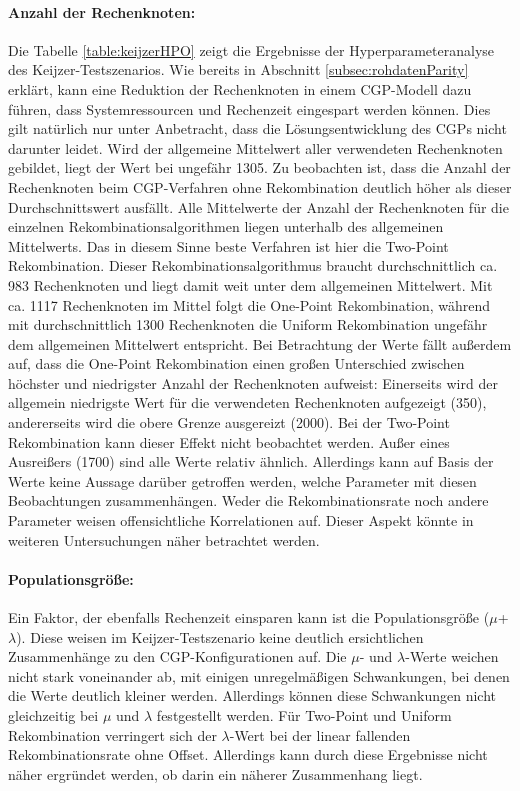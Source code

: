 \paragraph{Anzahl der Rechenknoten:}
Die Tabelle \ref{table:keijzerHPO} zeigt die Ergebnisse der Hyperparameteranalyse des Keijzer-Test\-sze\-narios.
Wie bereits in Abschnitt \ref{subsec:rohdatenParity} erklärt, kann eine Reduktion der Rechenknoten in einem CGP-Modell dazu führen, dass Systemressourcen und Rechenzeit eingespart werden können.
Dies gilt natürlich nur unter Anbetracht, dass die Lösungsentwicklung des CGPs nicht darunter leidet.
Wird der allgemeine Mittelwert aller verwendeten Rechenknoten gebildet, liegt der Wert bei ungefähr 1305. 
Zu beobachten ist, dass die Anzahl der Rechenknoten beim CGP-Verfahren ohne Rekombination deutlich höher als dieser Durchschnittswert ausfällt.
Alle Mittelwerte der Anzahl der Rechenknoten für die einzelnen Rekombinationsalgorithmen liegen unterhalb des allgemeinen Mittelwerts.
Das in diesem Sinne beste Verfahren ist hier die Two-Point Rekombination.
Dieser Rekombinationsalgorithmus braucht durchschnittlich ca. 983 Rechenknoten und liegt damit weit unter dem allgemeinen Mittelwert.
Mit ca. 1117 Rechenknoten im Mittel folgt die One-Point Rekombination, während mit durchschnittlich 1300 Rechenknoten die Uniform Rekombination ungefähr dem allgemeinen Mittelwert entspricht.
Bei Betrachtung der Werte fällt außerdem auf, dass die One-Point Rekombination einen großen Unterschied zwischen höchster und niedrigster Anzahl der Rechenknoten aufweist:
Einerseits wird der allgemein niedrigste Wert für die verwendeten Rechenknoten aufgezeigt (350), andererseits wird die obere Grenze ausgereizt (2000).
Bei der Two-Point Rekombination kann dieser Effekt nicht beobachtet werden.
Außer eines Ausreißers (1700) sind alle Werte relativ ähnlich.
Allerdings kann auf Basis der Werte keine Aussage darüber getroffen werden, welche Parameter mit diesen Beobachtungen zusammenhängen.
Weder die Rekombinationsrate noch andere Parameter weisen offensichtliche Korrelationen auf.
Dieser Aspekt könnte in weiteren Untersuchungen näher betrachtet werden.
\paragraph{Populationsgröße:}
Ein Faktor, der ebenfalls Rechenzeit einsparen kann ist die Populationsgröße ($\mu$+$\lambda$).
Diese weisen im Keijzer-Testszenario keine deutlich ersichtlichen Zusammenhänge zu den CGP-Konfigurationen auf.
Die $\mu$- und $\lambda$-Werte weichen nicht stark voneinander ab, mit einigen unregelmäßigen Schwankungen, bei denen die Werte deutlich kleiner werden.
Allerdings können diese Schwankungen nicht gleichzeitig bei $\mu$ und $\lambda$ festgestellt werden.
Für Two-Point und Uniform Rekombination verringert sich der $\lambda$-Wert bei der linear fallenden Rekombinationsrate ohne Offset.
Allerdings kann durch diese Ergebnisse nicht näher ergründet werden, ob darin ein näherer Zusammenhang liegt.
